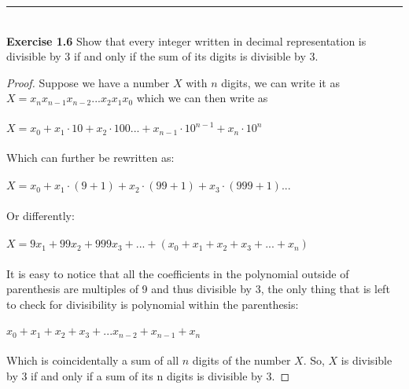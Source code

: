 \documentclass[a4paper]{article}
\begin{document}
\noindent\rule{12cm}{0.4pt}\\
\noindent \textbf{Exercise 1.6} Show that every integer written in decimal representation is divisible by 3 if and only if the sum of its digits is divisible by 3.
\begin{proof}
Suppose we have a number $X$ with $n$ digits, we can write it as $X=x_n x_{n-1}x_{n-2}...x_2x_1x_0$ which we can then write as \\\\
 $X=x_0+x_1 \cdot 10 + x_2 \cdot 100 ... + x_{n-1} \cdot 10^{n-1} + x_n \cdot 10^n$ \\\\
 Which can further be rewritten as: \\\\
 $X = x_0 + x_1 \cdot (9 + 1) + x_2 \cdot (99 + 1) + x_3 \cdot (999 + 1)...$\\\\
 Or differently: \\\\
 $X = 9x_1 + 99x_2 + 999x_3 + ... + (x_0 + x_1 + x_2 + x_3 + ... + x_n)$ \\\\
 It is easy to notice that all the coefficients in the polynomial outside of parenthesis are multiples of 9 and thus divisible by 3, the only thing that is left to check for divisibility is polynomial within the parenthesis: \\\\
 $ x_0 + x_1 + x_2 + x_3 + ... x_{n-2} + x_{n-1} + x_n$ \\\\
 Which is coincidentally a sum of all $n$ digits of the number $X$. So, $X$ is divisible by 3 if and only if a sum of its n digits is divisible by 3. 
\end{proof}
\end{document}
